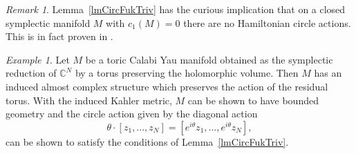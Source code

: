 \documentclass[11pt]{amsart}
\newcommand{\C}{\mathbb{C}}
\theoremstyle{definition}
\theoremstyle{remark}
\newtheorem{rem}[tm]{Remark}
\newtheorem{ex}[tm]{Example}
\begin{document}
\begin{rem}
Lemma~\ref{lmCircFukTriv} has the curious implication that on a closed symplectic manifold $M$ with $c_1(M)=0$ there are no Hamiltonian circle actions. This is in fact proven in \cite{Ono88}.
\end{rem}
\begin{ex}\label{exTCy}
Let $M$ be a toric Calabi Yau manifold obtained as the symplectic reduction of $\C^N$ by a torus preserving the holomorphic volume. Then $M$ has an induced almost complex structure which preserves the action of the residual torus. With the induced Kahler metric, $M$ can be shown to have bounded geometry and the circle action given by the diagonal action
\[
    \theta\cdot[z_1,...,z_N]=[e^{i\theta}z_1,...,e^{i\theta}z_N],
\]
can be shown to satisfy the conditions of Lemma~\ref{lmCircFukTriv}.
\end{ex}
\end{document}
